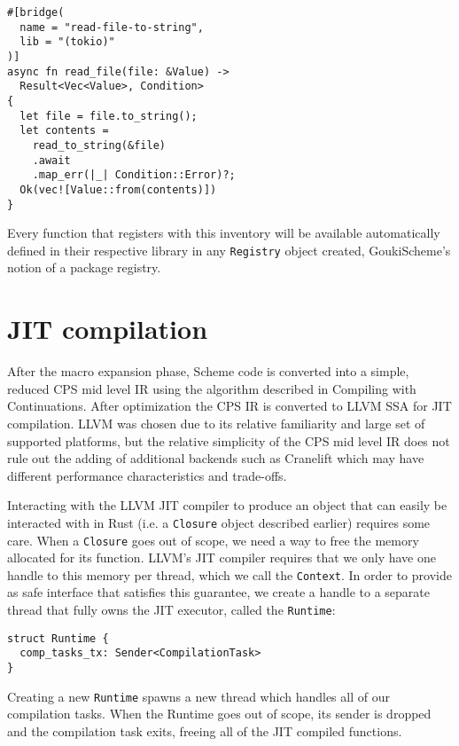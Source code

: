 \documentclass[sigplan,review,anonymous]{acmart}
\begin{document}
\begin{verbatim}
#[bridge(
  name = "read-file-to-string",
  lib = "(tokio)"
)]
async fn read_file(file: &Value) ->
  Result<Vec<Value>, Condition>
{
  let file = file.to_string();
  let contents =
    read_to_string(&file)
    .await
    .map_err(|_| Condition::Error)?;
  Ok(vec![Value::from(contents)])
}
\end{verbatim}

Every function that registers with this inventory will be available automatically
defined in their respective library in any \texttt{Registry} object created,
GoukiScheme's notion of a package registry.

\section{JIT compilation}

After the macro expansion phase, Scheme code is converted into a simple, reduced
CPS mid level IR using the algorithm described in Compiling with
Continuations\cite{cwc}. After optimization the CPS IR is converted to
LLVM SSA\cite{llvm} for JIT compilation. LLVM was chosen due to its relative
familiarity and large set of supported platforms, but the relative simplicity of
the CPS mid level IR does not rule out the adding of additional backends such
as Cranelift\cite{cranelift} which may have different performance
characteristics and trade-offs.

Interacting with the LLVM JIT compiler to produce an object that can easily be
interacted with in Rust (i.e. a \texttt{Closure} object described earlier)
requires some care. When a \texttt{Closure} goes out of scope, we need a way to
free the memory allocated for its function. LLVM's JIT compiler requires that
we only have one handle to this memory per thread, which we call the
\texttt{Context}\cite{context}. In order to provide as safe interface that
satisfies this guarantee, we create a handle to a separate thread that fully owns
the JIT executor, called the \texttt{Runtime}:

\begin{verbatim}
struct Runtime {
  comp_tasks_tx: Sender<CompilationTask>
}
\end{verbatim}

Creating a new \texttt{Runtime} spawns a new thread which handles all of our
compilation tasks. When the Runtime goes out of scope, its sender is dropped
and the compilation task exits, freeing all of the JIT compiled functions.
\end{document}
